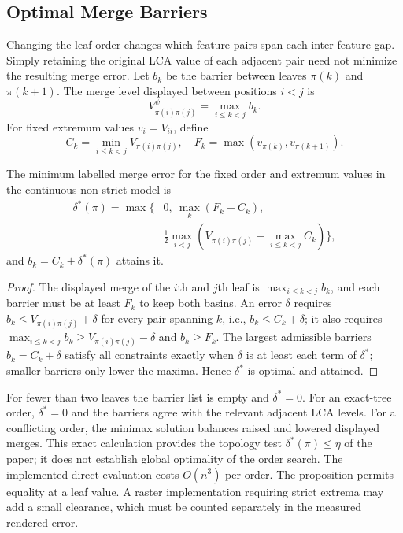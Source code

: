 \documentclass[preprint]{vgtc}   %
\begin{document}
\subsection{Optimal Merge Barriers}\label{sec:barriers}
Changing the leaf order changes which feature pairs span each inter-feature gap. Simply retaining the original LCA value of each adjacent pair need not minimize the resulting merge error. Let $b_k$ be the barrier between leaves $\pi(k)$ and $\pi(k+1)$. The merge level displayed between positions $i<j$ is
\begin{equation}\label{eq:maxbarrier}
 V_{\pi(i)\pi(j)}^{\psi}=\max_{i\le k<j}b_k.
\end{equation}
For fixed extremum values $v_i=V_{ii}$, define
\begin{equation}
 C_k=\min_{i\le k<j}V_{\pi(i)\pi(j)},\quad
 F_k=\max(v_{\pi(k)},v_{\pi(k+1)}).
\end{equation}
\begin{proposition}\label{prop:barriers}
The minimum labelled merge error for the fixed order and extremum values in the continuous non-strict model is
\begin{equation}\label{eq:delta}
\begin{split}
\delta^*(\pi)=\max\bigg\{&0,\ \max_k(F_k-C_k),\\
 &\frac12\max_{i<j}\left(V_{\pi(i)\pi(j)}-
                         \max_{i\le k<j}C_k\right)\bigg\},
\end{split}
\end{equation}
and $b_k=C_k+\delta^*(\pi)$ attains it.
\end{proposition}
\begin{proof}
The displayed merge of the $i$th and $j$th leaf is $\max_{i\le k<j}b_k$, and each barrier must be at least $F_k$ to keep both basins. An error $\delta$ requires $b_k\le V_{\pi(i)\pi(j)}+\delta$ for every pair spanning $k$, i.e., $b_k\le C_k+\delta$; it also requires $\max_{i\le k<j}b_k\ge V_{\pi(i)\pi(j)}-\delta$ and $b_k\ge F_k$. The largest admissible barriers $b_k=C_k+\delta$ satisfy all constraints exactly when $\delta$ is at least each term of $\delta^*$; smaller barriers only lower the maxima. Hence $\delta^*$ is optimal and attained.
\end{proof}
For fewer than two leaves the barrier list is empty and $\delta^*=0$. For an exact-tree order, $\delta^*=0$ and the barriers agree with the relevant adjacent LCA levels. For a conflicting order, the minimax solution balances raised and lowered displayed merges. This exact calculation provides the topology test $\delta^*(\pi)\le\eta$ of the paper; it does not establish global optimality of the order search. The implemented direct evaluation costs $O(n^3)$ per order. The proposition permits equality at a leaf value. A raster implementation requiring strict extrema may add a small clearance, which must be counted separately in the measured rendered error.
\end{document}
